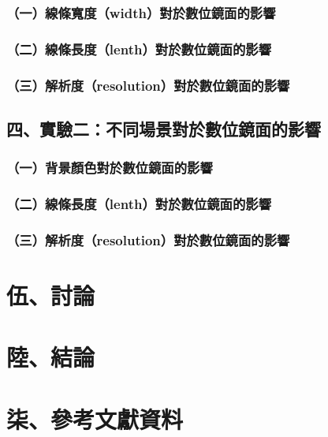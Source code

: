 \documentclass[12pt]{article}
\begin{document}
\subsubsection{（一）線條寬度（width）對於數位鏡面的影響}

\subsubsection{（二）線條長度（lenth）對於數位鏡面的影響}

\subsubsection{（三）解析度（resolution）對於數位鏡面的影響}

\subsection{四、實驗二：不同場景對於數位鏡面的影響}

\subsubsection{（一）背景顏色對於數位鏡面的影響}

\subsubsection{（二）線條長度（lenth）對於數位鏡面的影響}

\subsubsection{（三）解析度（resolution）對於數位鏡面的影響}

\newpage
\section{伍、討論}

\newpage
\section{陸、結論}

\newpage
\section{柒、參考文獻資料}



\end{document}
